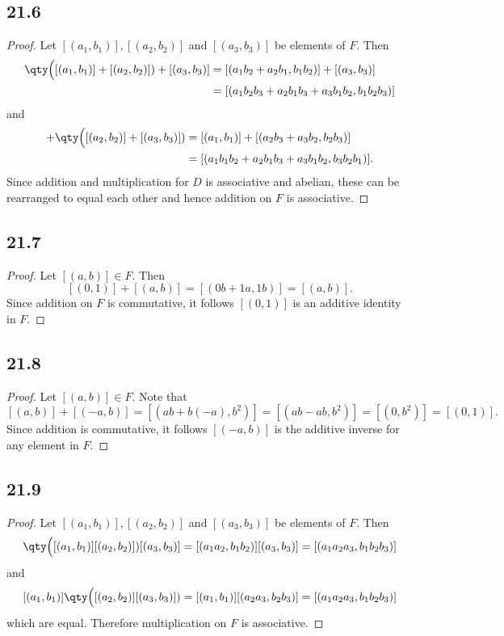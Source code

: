 \documentclass[12pt,titlepage]{extarticle}
\begin{document}
\subsection*{21.6}
\begin{proof}
    Let $[(a_1,b_1)], [(a_2,b_2)]$ and $[(a_3, b_3)]$ be elements of $F$. Then
    \begin{align*}
        \qty\Big([(a_1, b_1)] + [(a_2, b_2)]) + [(a_3,b_3)] &= [(a_1 b_2 + a_2 b_1, b_1 b_2)] + [(a_3,b_3)] \\
        &= [(
            a_1 b_2 b_3 + a_2 b_1 b_3 + a_3 b_1 b_2, b_1 b_2 b_3
        )]
    \end{align*}
    and
    \begin{align*}
        [(a_1, b_1)] + \qty\Big([(a_2, b_2)] + [(a_3,b_3)]) &= [(a_1,b_1)] + [(a_2 b_3 + a_3 b_2, b_2 b_3)] \\
        &= [(
            a_1 b_1 b_2 + a_2 b_1 b_3 + a_3 b_1 b_2, b_3 b_2 b_1
        )].
    \end{align*}
    Since addition and multiplication for $D$ is associative and abelian, these can be rearranged to equal each other and hence addition on $F$ is associative.
\end{proof}

\subsection*{21.7}
\begin{proof}
    Let $[(a,b)] \in F$. Then
    \[
        [(0,1)] + [(a,b)] = [(0b + 1a, 1b)] = [(a,b)]
    .\]
    Since addition on $F$ is commutative, it follows $[(0,1)]$ is an additive identity in $F$.
\end{proof}

\subsection*{21.8}
\begin{proof}
    Let $[(a,b)] \in F$. Note that
    \[
        [(a,b)] + [(-a, b)] = [(ab + b(-a), b^2)] = [(ab - ab, b^2)] = [(0, b^2)] = [(0, 1)]
    .\]
    Since addition is commutative, it follows $[(-a,b)]$ is the additive inverse for any element in $F$.
\end{proof}

\subsection*{21.9}
\begin{proof}
    Let $[(a_1,b_1)], [(a_2,b_2)]$ and $[(a_3, b_3)]$ be elements of $F$. Then
    \[
        \qty\Big([(a_1,b_1)] [(a_2,b_2)]) [(a_3,b_3)] = [(a_1 a_2, b_1 b_2)] [(a_3, b_3)] = [(a_1 a_2 a_3, b_1 b_2 b_3)]
    \]
    and
    \[
        [(a_1,b_1)] \qty\Big([(a_2,b_2)] [(a_3,b_3)]) = [(a_1, b_1)] [(a_2 a_3, b_2 b_3)] = [(a_1 a_2 a_3, b_1 b_2 b_3)]
    \]
    which are equal. Therefore multiplication on $F$ is associative.
\end{proof}
\end{document}
